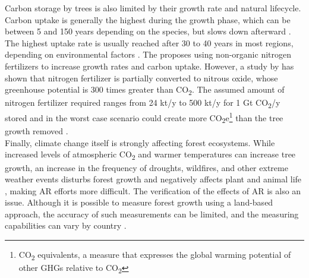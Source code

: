 Carbon storage by trees is also limited by their growth rate and natural lifecycle. Carbon uptake is generally the highest during the growth phase, which can be between 5 and 150 years depending on the species, but slows down afterward \parencite[268]{Watson2000LandForestry}. The highest uptake rate is usually reached after 30 to 40 years in most regions, depending on environmental factors \parencite[40]{NRC2015ClimateSequestration}. The \textcite[215]{Watson2000LandForestry} proposes using non-organic nitrogen fertilizers to increase growth rates and carbon uptake. However, a study by \textcite{Crutzen2008AtmosphericPhysics} has shown that nitrogen fertilizer is partially converted to nitrous oxide, whose greenhouse potential is 300 times greater than CO\textsubscript{2}. The assumed amount of nitrogen fertilizer required ranges from 24 kt/y \parencite{Rau2013DirectProduction} to 500 kt/y \parencite{Dipple2021TheSystems} for 1 Gt CO\textsubscript{2}/y stored and in the worst case scenario could create more CO\textsubscript{2}e\footnote{CO\textsubscript{2} equivalents, a measure that expresses the global warming potential of other GHGs relative to CO\textsubscript{2}} than the tree growth removed \parencite[40]{NRC2015ClimateSequestration}.\\Finally, climate change itself is strongly affecting forest ecosystems. While increased levels of atmospheric CO\textsubscript{2} and warmer temperatures can increase tree growth, an increase in the frequency of droughts, wildfires, and other extreme weather events disturbs forest growth and negatively affects plant and animal life \parencite{EPA2015ClimateForests}, making AR efforts more difficult.
The verification of the effects of AR is also an issue. Although it is possible to measure forest growth using a land-based approach, the accuracy of such measurements can be limited, and the measuring capabilities can vary by country \parencite[217]{Watson2000LandForestry}.
